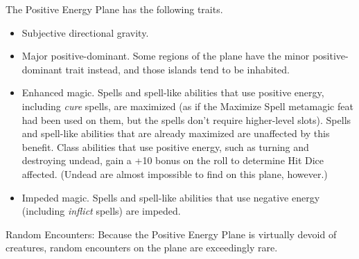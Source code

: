 The Positive Energy Plane has the following traits.

\begin{itemize}
\item Subjective directional gravity.
\item Major positive-dominant. Some regions of the plane have the minor positive-dominant 
trait instead, and those islands tend to be inhabited.
\item Enhanced magic. Spells and spell-like abilities that use positive energy, including 
\textit{cure} spells, are maximized (as if the Maximize Spell metamagic feat had 
been used on them, but the spells don't require higher-level slots). Spells and 
spell-like abilities that are already maximized are unaffected by this benefit. 
Class abilities that use positive energy, such as turning and destroying undead, 
gain a +10 bonus on the roll to determine Hit Dice affected. (Undead are almost 
impossible to find on this plane, however.)
\item Impeded magic. Spells and spell-like abilities that use negative energy (including 
\textit{inflict} spells) are impeded.
\end{itemize}

Random Encounters: Because the Positive Energy Plane is virtually devoid of creatures, 
random encounters on the plane are exceedingly rare.

